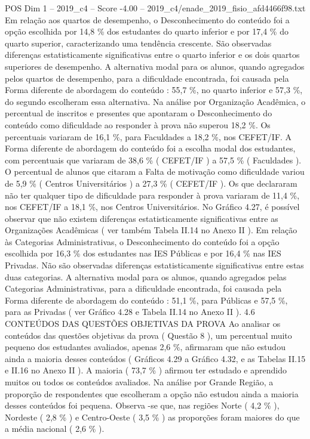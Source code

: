 \begin{textsample}{POS Dim 1 – 2019\_c4 – Score -4.00 – 2019\_c4/enade\_2019\_fisio\_afd4466f98.txt}
Em relação aos quartos de desempenho, o Desconhecimento do conteúdo foi a opção escolhida por 14,8 \% dos estudantes do quarto inferior e por 17,4 \% do quarto superior, caracterizando uma tendência crescente.
São observadas diferenças estatisticamente significativas entre o quarto inferior e os dois quartos superiores de desempenho.
A alternativa modal para os alunos, quando agregados pelos quartos de desempenho, para a dificuldade encontrada, foi causada pela Forma diferente de abordagem do conteúdo : 55,7 \%, no quarto inferior e 57,3 \%, do segundo escolheram essa alternativa.
Na análise por Organização Acadêmica, o percentual de inscritos e presentes que apontaram o Desconhecimento do conteúdo como dificuldade ao responder à prova não superou 18,2 \%.
Os percentuais variaram de 16,1 \%, para Faculdades a 18,2 \%, nos CEFET/IF.
A Forma diferente de abordagem do conteúdo foi a escolha modal dos estudantes, com percentuais que variaram de 38,6 \% ( CEFET/IF ) a 57,5 \% ( Faculdades ).
O percentual de alunos que citaram a Falta de motivação como dificuldade variou de 5,9 \% ( Centros Universitários ) a 27,3 \% ( CEFET/IF ).
Os que declararam não ter qualquer tipo de dificuldade para responder à prova variaram de 11,4 \%, nos CEFET/IF a 18,1 \%, nos Centros Universitários.
No Gráfico 4.27, é possível observar que não existem diferenças estatisticamente significativas entre as Organizações Acadêmicas ( ver também Tabela II.14 no Anexo II ).
Em relação às Categorias Administrativas, o Desconhecimento do conteúdo foi a opção escolhida por 16,3 \% dos estudantes nas IES Públicas e por 16,4 \% nas IES Privadas.
Não são observadas diferenças estatisticamente significativas entre estas duas categorias.
A alternativa modal para os alunos, quando agregados pelas Categorias Administrativas, para a dificuldade encontrada, foi causada pela Forma diferente de abordagem do conteúdo : 51,1 \%, para Públicas e 57,5 \%, para as Privadas ( ver Gráfico 4.28 e Tabela II.14 no Anexo II ). 4.6 CONTEÚDOS DAS QUESTÕES OBJETIVAS DA PROVA Ao analisar os conteúdos das questões objetivas da prova ( Questão 8 ), um percentual muito pequeno dos estudantes avaliados, apenas 2,6 \%, afirmaram que não estudou ainda a maioria desses conteúdos ( Gráficos 4.29 a Gráfico 4.32, e as Tabelas II.15 e II.16 no Anexo II ).
A maioria ( 73,7 \% ) afirmou ter estudado e aprendido muitos ou todos os conteúdos avaliados.
Na análise por Grande Região, a proporção de respondentes que escolheram a opção não estudou ainda a maioria desses conteúdos foi pequena.
Observa -se que, nas regiões Norte ( 4,2 \% ), Nordeste ( 2,8 \% ) e Centro-Oeste ( 3,5 \% ) as proporções foram maiores do que a média nacional ( 2,6 \% ).

\end{textsample}
